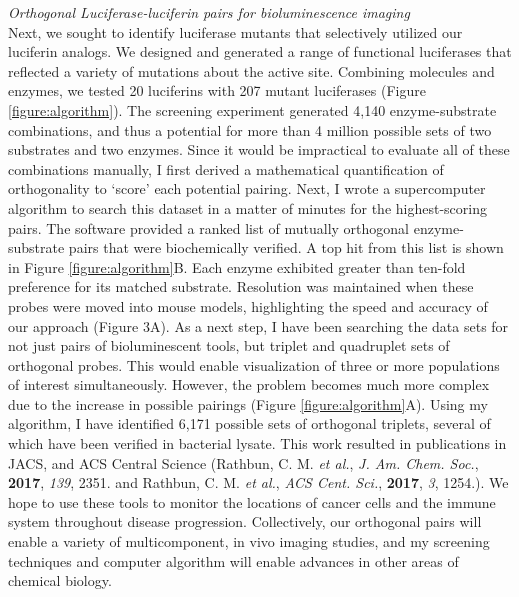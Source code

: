 \documentclass{F32}
\begin{document}
\textit{Orthogonal Luciferase-luciferin pairs for bioluminescence imaging}\\
Next, we sought to identify luciferase mutants that selectively utilized our luciferin analogs. We designed and generated a range of functional luciferases that reflected a variety of mutations about the active site. Combining molecules and enzymes, we tested 20 luciferins with 207 mutant luciferases (Figure \ref{figure:algorithm}). The screening experiment generated 4,140 enzyme-substrate combinations, and thus a potential for more than 4 million possible sets of two substrates and two enzymes. Since it would be impractical to evaluate all of these combinations manually, I first derived a mathematical quantification of orthogonality to ‘score’ each potential pairing. Next, I wrote a supercomputer algorithm to search this dataset in a matter of minutes for the highest-scoring pairs. The software provided a ranked list of mutually orthogonal enzyme-substrate pairs that were biochemically verified. A top hit from this list is shown in Figure \ref{figure:algorithm}B. Each enzyme exhibited greater than ten-fold preference for its matched substrate. Resolution was maintained when these probes were moved into mouse models, highlighting the speed and accuracy of our approach (Figure 3A). As a next step, I have been searching the data sets for not just pairs of bioluminescent tools, but triplet and quadruplet sets of orthogonal probes. This would enable visualization of three or more populations of interest simultaneously. However, the problem becomes much more complex due to the increase in possible pairings (Figure \ref{figure:algorithm}A). Using my algorithm, I have identified 6,171 possible sets of orthogonal triplets, several of which have been verified in bacterial lysate. This work resulted in publications in JACS, and ACS Central Science (Rathbun, C. M. \textit{et al.}, \textit{J. Am. Chem. Soc.}, \textbf{2017}, \textit{139}, 2351. and Rathbun, C. M. \textit{et al.}, \textit{ACS Cent. Sci.}, \textbf{2017}, \textit{3}, 1254.). We hope to use these tools to monitor the locations of cancer cells and the immune system throughout disease progression. Collectively, our orthogonal pairs will enable a variety of multicomponent, in vivo imaging studies, and my screening techniques and computer algorithm will enable advances in other areas of chemical biology.
\end{document}
